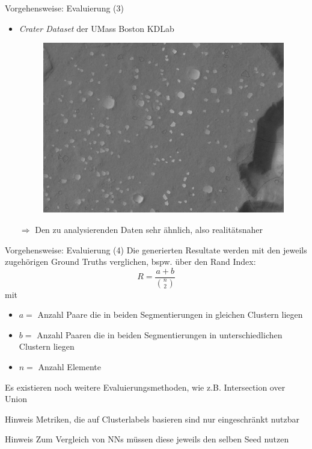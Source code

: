 \documentclass[9pt]{beamer}
\begin{document}
\begin{frame}{Vorgehensweise: Evaluierung (3)}
\begin{itemize}
	\item \textit{Crater Dataset} der UMass Boston
	 KDLab\footnotemark[1]
	 \begin{figure}[H]
	 	\includegraphics[width=.7\textwidth,keepaspectratio]{bandeira_detected.png}
	 \end{figure}
	\item[$\Rightarrow$] Den zu analysierenden Daten sehr ähnlich, also realitätsnaher
\end{itemize}
\end{frame}

\begin{frame}{Vorgehensweise: Evaluierung (4)}
Die generierten Resultate werden mit den jeweils zugehörigen Ground Truths verglichen, bspw. über den Rand Index:
\[R = \frac{a+b}{\binom{n}{2}}\]
mit
\begin{itemize}
	\item{$a=$} Anzahl Paare die in beiden Segmentierungen in gleichen Clustern liegen
	\item{$b=$} Anzahl Paaren die in beiden Segmentierungen in unterschiedlichen Clustern liegen
	\item{$n=$} Anzahl Elemente
\end{itemize}
\bigskip
Es existieren noch weitere Evaluierungsmethoden, wie z.B. Intersection over Union
\pause
\bigskip
\begin{block}{Hinweis}
	Metriken, die auf Clusterlabels basieren sind nur eingeschränkt nutzbar
\end{block}
\pause
\bigskip
\begin{block}{Hinweis}
	Zum Vergleich von NNs müssen diese jeweils den selben Seed nutzen
\end{block}
\end{frame}
\end{document}
